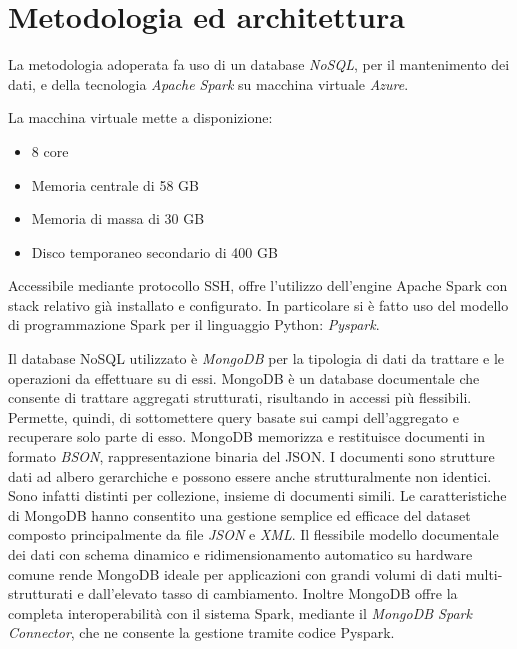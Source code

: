 \chapter{Metodologia ed architettura}
La metodologia adoperata fa uso di un database \emph{NoSQL}, per il mantenimento dei dati, e della tecnologia \emph{Apache Spark} su macchina virtuale \emph{Azure}.\par 
La macchina virtuale mette a disponizione:
\begin{itemize}
	\item 8 core
	\item Memoria centrale di 58 GB
	\item Memoria di massa di 30 GB
	\item Disco temporaneo secondario di 400 GB
\end{itemize}
Accessibile mediante protocollo SSH, offre l'utilizzo dell'engine Apache Spark con stack relativo già installato e configurato. In particolare si è fatto uso del modello di programmazione Spark per il linguaggio Python: \emph{Pyspark}.\par
Il database NoSQL utilizzato è \emph{MongoDB} per la tipologia di dati da trattare e le operazioni da effettuare su di essi. MongoDB è un database documentale che consente di trattare aggregati strutturati, risultando in accessi più flessibili. Permette, quindi, di sottomettere query basate sui campi dell'aggregato e recuperare solo parte di esso. MongoDB memorizza e restituisce documenti in formato \emph{BSON}, rappresentazione binaria del JSON. I documenti sono strutture dati ad albero gerarchiche e possono essere anche strutturalmente non identici. Sono infatti distinti per collezione, insieme di documenti simili. Le caratteristiche di MongoDB hanno consentito una gestione semplice ed efficace del dataset composto principalmente da file \emph{JSON} e \emph{XML}. Il flessibile modello documentale dei dati con schema dinamico e ridimensionamento automatico su hardware comune rende MongoDB ideale per applicazioni con grandi volumi di dati multi-strutturati e dall'elevato tasso di cambiamento. Inoltre MongoDB offre la completa interoperabilità con il sistema Spark, mediante il \emph{MongoDB Spark Connector}, che ne consente la gestione tramite codice Pyspark.

